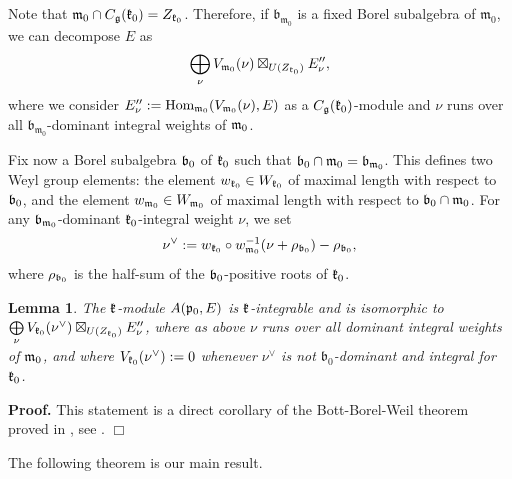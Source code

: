 \documentclass[12pt]{article}
\newcounter{theorem}
\newtheorem{lemma}[theo]{Lemma}
\newenvironment{proof}{ \textbf{Proof.}}{$\Box$}
\newcommand{\kk}{\mathfrak{k}}
\newcommand{\mm}{\mathfrak{m}}
\newcommand{\bb}{\mathfrak{b}}
\begin{document}
Note that $\frak m_0\cap C_{\frak g} (\frak k_0) = Z_{\frak k_{0}}$. Therefore, if $\bb_{\mm_0}$ is a fixed Borel subalgebra of $\mm_0$, we can decompose $E$ as
$$
\bigoplus\limits_\nu V_{{\frak m}_{0}} (\nu) \boxtimes_{U(Z_{\kk_0})} E''_\nu,
$$
where we consider $E''_\nu := \text{Hom}_{{\frak m}_{0}} (V_{{\frak m}_{0}} (\nu ), E)$ as a $C_{\frak g} (\frak k_0)$-module and $\nu$ runs over all $\bb_{\mm_0}$-dominant integral weights of $\frak m_0$.

Fix now a Borel subalgebra $\frak b_0$ of $\frak k_0$ such that $\frak b_0 \cap\mm_0=\bb_{\mm_0}$.  This defines two Weyl group elements:  the element $w_{\frak k_{0}}\in W_{\frak k_{0}}$ of maximal length with respect to $\frak b_0$, and the element $w_{\frak m_{0}}\in W_{\frak m_{0}}$ of maximal length with respect to $\frak b_0\cap \frak m_0$.  For any $\frak b_{\mm_0}$-dominant $\frak k_0$-integral weight $\nu$, we set
$$
\nu^{\vee} := w_{\frak k_{0}}\circ w^{-1}_{\frak m_{0}} (\nu + \rho_{\frak b_{0}}) - \rho_{\frak b_{0}},
$$
where $\rho_{\frak b_{0}}$ is the half-sum of the $\frak b_0$-positive roots of $\frak k_0$.

\begin{lemma} \label{le21} The $\frak k$-module $A(\frak p_0, E)$ is $\frak k$-integrable and is isomorphic to $\bigoplus\limits_\nu V_{\frak k_{0}} (\nu^{\vee})\boxtimes_{U(Z_{\kk_0})} E''_\nu$, where as above $\nu$ runs over all dominant integral weights of $\frak m_0$, and where $V_{\frak k_{0}}  (\nu^{\vee}) := 0$ whenever $\nu^{\vee}$ is not $\bb_0$-dominant and integral for $\frak k_0$.
\end{lemma}

\begin{proof} This statement is a direct corollary of the Bott-Borel-Weil theorem proved in \cite{EW}, see \cite[Proposition 6.3]{EW}. \end{proof}

The following theorem is our main result.
\end{document}

